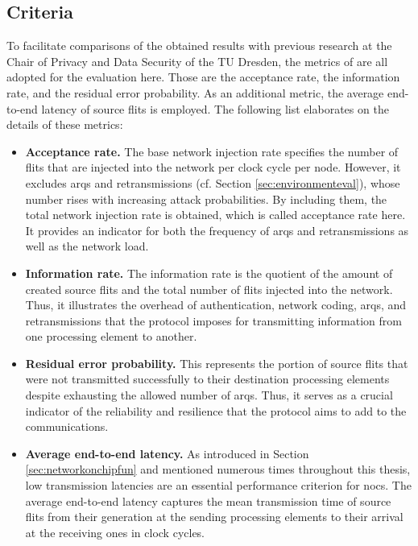 \subsection{Criteria}
To facilitate comparisons of the obtained results with previous research at the Chair of Privacy and Data Security of the TU Dresden, the metrics of
\citeauthor{moriam18activeattackers} \cite{moriam18activeattackers} are all adopted for the evaluation here. Those are the acceptance rate, the
information rate, and the residual error probability. As an additional metric, the average end-to-end latency of source flits is employed. The following list elaborates on the
details of these metrics:
\begin{itemize}
    \item \textbf{Acceptance rate.} The base network injection rate specifies the number of flits that are injected into the network per clock cycle
        per node. However, it excludes \glspl{arq} and retransmissions (cf. Section \ref{sec:environmenteval}), whose number rises with increasing
        attack probabilities. By including them, the total network injection rate is obtained, which is called acceptance rate here. It provides an
        indicator for both the frequency of \glspl{arq} and retransmissions as well as the network load.
    \item \textbf{Information rate.} The information rate is the quotient of the amount of created source flits and the total number of flits injected
        into the network. Thus, it illustrates the overhead of authentication, network coding, \glspl{arq}, and retransmissions that the protocol
        imposes for transmitting information from one processing element to another.
    \item \textbf{Residual error probability.} This represents the portion of source flits that were not transmitted successfully to their destination
        processing elements despite exhausting the allowed number of \glspl{arq}. Thus, it serves as a crucial indicator of the reliability and
        resilience that the protocol aims to add to the communications.
    \item \textbf{Average end-to-end latency.} As introduced in Section \ref{sec:networkonchipfun} and mentioned numerous times throughout this
        thesis, low transmission latencies are an essential performance criterion for \glspl{noc}. The average end-to-end latency captures the mean
        transmission time of source flits from their generation at the sending processing elements to their arrival at the receiving ones in clock
        cycles.
\end{itemize}

